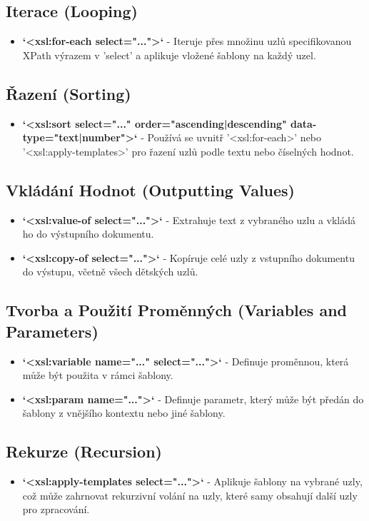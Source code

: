 \subsection{Iterace (Looping)}
\begin{itemize}
    \item \textbf{`<xsl:for-each select="...">`} - Iteruje přes množinu uzlů specifikovanou XPath výrazem v 'select' a aplikuje vložené šablony na každý uzel.

\end{itemize}

\subsection{Řazení (Sorting)}
\begin{itemize}
    \item \textbf{`<xsl:sort select="..." order="ascending|descending" data-type="text|number">`} - Používá se uvnitř '<xsl:for-each>' nebo '<xsl:apply-templates>' pro řazení uzlů podle textu nebo číselných hodnot.
\end{itemize}

\subsection{Vkládání Hodnot (Outputting Values)}
\begin{itemize}
    \item \textbf{`<xsl:value-of select="...">`} - Extrahuje text z vybraného uzlu a vkládá ho do výstupního dokumentu.
    \item \textbf{`<xsl:copy-of select="...">`} - Kopíruje celé uzly z vstupního dokumentu do výstupu, včetně všech dětských uzlů.
\end{itemize}

\subsection{Tvorba a Použití Proměnných (Variables and Parameters)}
\begin{itemize}
    \item \textbf{`<xsl:variable name="..." select="...">`} - Definuje proměnnou, která může být použita v rámci šablony.
    \item \textbf{`<xsl:param name="...">`} - Definuje parametr, který může být předán do šablony z vnějšího kontextu nebo jiné šablony.
\end{itemize}

\subsection{Rekurze (Recursion)}
\begin{itemize}
    \item \textbf{`<xsl:apply-templates select="...">`} - Aplikuje šablony na vybrané uzly, což může zahrnovat rekurzivní volání na uzly, které samy obsahují další uzly pro zpracování.
\end{itemize}

